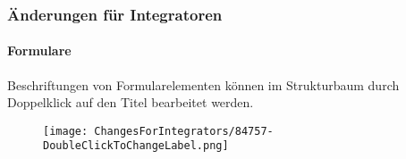 
\begin{frame}[fragile]
	\frametitle{Änderungen für Integratoren}
	\framesubtitle{Formulare}

	\lstset{basicstyle=\tiny\ttfamily}

	Beschriftungen von Formularelementen können im Strukturbaum durch Doppelklick auf den Titel bearbeitet werden. 

	\begin{figure}
		\texttt{[image: ChangesForIntegrators/84757-DoubleClickToChangeLabel.png]}
	\end{figure}

\end{frame}


